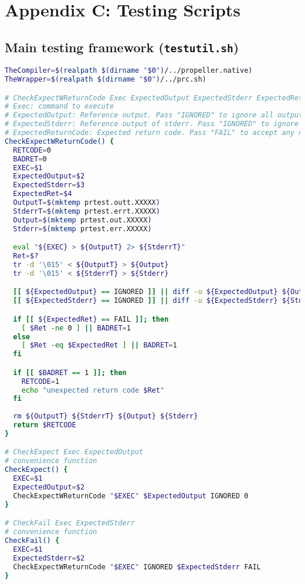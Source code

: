 \section{Appendix C: Testing Scripts}

\subsection{Main testing framework (\texttt{testutil.sh})}

\begin{lstlisting}[language=bash,backgroundcolor=\color{backgroundcolor}]
TheCompiler=$(realpath $(dirname "$0")/../propeller.native)
TheWrapper=$(realpath $(dirname "$0")/../prc.sh)

# CheckExpectWReturnCode Exec ExpectedOutput ExpectedStderr ExpectedReturnCode
# Exec: command to execute
# ExpectedOutput: Reference output. Pass "IGNORED" to ignore all output.
# ExpectedStderr: Reference output of stderr. Pass "IGNORED" to ignore all output to stderr.
# ExpectedReturnCode: Expected return code. Pass "FAIL" to accept any non-zero return code.
CheckExpectWReturnCode() {
  RETCODE=0
  BADRET=0
  EXEC=$1
  ExpectedOutput=$2
  ExpectedStderr=$3
  ExpectedRet=$4
  OutputT=$(mktemp prtest.outt.XXXXX)
  StderrT=$(mktemp prtest.errt.XXXXX)
  Output=$(mktemp prtest.out.XXXXX)
  Stderr=$(mktemp prtest.err.XXXXX)

  eval "${EXEC} > ${OutputT} 2> ${StderrT}"
  Ret=$?
  tr -d '\015' < ${OutputT} > ${Output}
  tr -d '\015' < ${StderrT} > ${Stderr}

  [[ ${ExpectedOutput} == IGNORED ]] || diff -u ${ExpectedOutput} ${Output} || RETCODE=1
  [[ ${ExpectedStderr} == IGNORED ]] || diff -u ${ExpectedStderr} ${Stderr} || RETCODE=1

  if [[ ${ExpectedRet} == FAIL ]]; then
    [ $Ret -ne 0 ] || BADRET=1
  else
    [ $Ret -eq $ExpectedRet ] || BADRET=1
  fi

  if [[ $BADRET == 1 ]]; then
    RETCODE=1
    echo "unexpected return code $Ret"
  fi
  
  rm ${OutputT} ${StderrT} ${Output} ${Stderr}
  return $RETCODE
}

# CheckExpect Exec ExpectedOutput
# convenience function
CheckExpect() {
  EXEC=$1
  ExpectedOutput=$2
  CheckExpectWReturnCode "$EXEC" $ExpectedOutput IGNORED 0
}

# CheckFail Exec ExpectedStderr
# convenience function
CheckFail() {
  EXEC=$1
  ExpectedStderr=$2
  CheckExpectWReturnCode "$EXEC" IGNORED $ExpectedStderr FAIL
}



\end{lstlisting}
